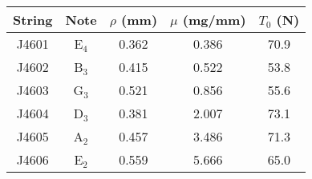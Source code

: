 \begin{tabular}{ccccc}
\toprule
String & Note & $\rho$ (mm) & $\mu$ (mg/mm) & $T_0$ (N) \\
\midrule
J4601 & E$_{4}$ & 0.362 & 0.386 & 70.9 \\
J4602 & B$_{3}$ & 0.415 & 0.522 & 53.8 \\
J4603 & G$_{3}$ & 0.521 & 0.856 & 55.6 \\
J4604 & D$_{3}$ & 0.381 & 2.007 & 73.1 \\
J4605 & A$_{2}$ & 0.457 & 3.486 & 71.3 \\
J4606 & E$_{2}$ & 0.559 & 5.666 & 65.0 \\
\bottomrule
\end{tabular}
